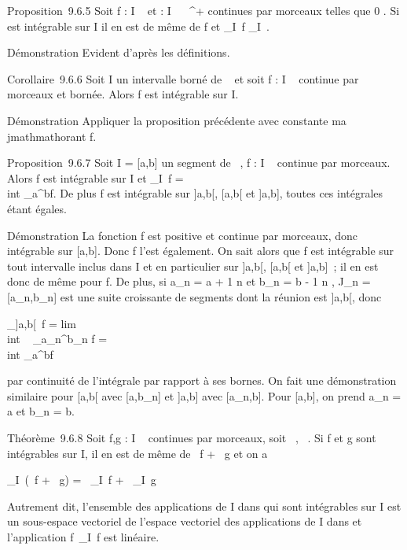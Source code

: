 \documentclass[]{article}
\begin{document}
Proposition~9.6.5 Soit f : I \rightarrow~  et \phi : I \rightarrow~ ~^+ continues par
morceaux telles que 0 \leqf\leq \phi. Si \phi est intégrable sur
I il en est de même de f et \left
\int  _I~f\right
\leq\int  _I~\phi.

Démonstration Evident d'après les définitions.

Corollaire~9.6.6 Soit I un intervalle borné de ~ et soit f : I \rightarrow~ 
continue par morceaux et bornée. Alors f est intégrable sur I.

Démonstration Appliquer la proposition précédente avec \phi constante
ma\\jmathmathorant f.

Proposition~9.6.7 Soit I = {[}a,b{]} un segment de ~, f : I \rightarrow~  continue
par morceaux. Alors f est intégrable sur I et
\int  _I~f =\\int
 _a^bf. De plus f est intégrable sur {]}a,b{[},
{[}a,b{[} et {]}a,b{]}, toutes ces intégrales étant égales.

Démonstration La fonction f est positive et continue
par morceaux, donc intégrable sur {[}a,b{]}. Donc f l'est également. On
sait alors que f est intégrable sur tout intervalle
inclus dans I et en particulier sur {]}a,b{[}, {[}a,b{[} et {]}a,b{]}~;
il en est donc de même pour f. De plus, si a_n = a + 1
\over n et b_n = b - 1 \over
n , J_n = {[}a_n,b_n{]} est une suite
croissante de segments dont la réunion est {]}a,b{[}, donc

\int  _{]}a,b{[}~f
= lim\\int ~
_a_n^b_n f =\\int
 _a^bf

par continuité de l'intégrale par rapport à ses bornes. On fait une
démonstration similaire pour {[}a,b{[} avec {[}a,b_n{]} et
{]}a,b{]} avec {[}a_n,b{]}. Pour {[}a,b{]}, on prend
a_n = a et b_n = b.

Théorème~9.6.8 Soit f,g : I \rightarrow~  continues par morceaux, soit \alpha~,\beta~ \in {}. Si
f et g sont intégrables sur I, il en est de même de \alpha~f + \beta~g et on a

\int  _I~(\alpha~f + \beta~g) =
\alpha~\int  _I~f +
\beta~\int  _I~g

Autrement dit, l'ensemble des applications de I dans  qui sont
intégrables sur I est un sous-espace vectoriel de l'espace vectoriel des
applications de I dans  et l'application
f\mapsto~\int  _I~f
est linéaire.
\end{document}
